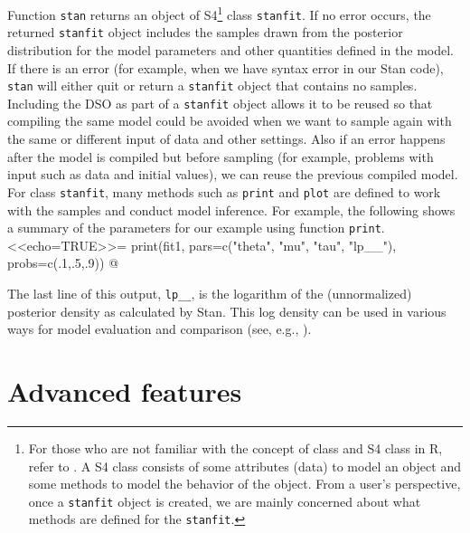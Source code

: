 \documentclass[12pt]{article}
\newcommand{\R}{R\xspace}
\newcommand{\Stan}{Stan\xspace}
\newcommand{\code}[1]{{\tt #1}}
\begin{document}
              Function \code{stan} returns an object of S4\footnote{For those who are not familiar 
                with the concept of class and S4 class in \R, refer to \cite{chambers2010software}. 
                A S4 class consists of some attributes (data) to model an object and 
                some methods to model the behavior of the object. From a user's perspective,  
                once a \code{stanfit} object is created, we are mainly concerned about what methods 
                are defined for the \code{stanfit}.} class \code{stanfit}.
                If no error occurs, the returned \code{stanfit} 
                object includes the samples drawn from the posterior distribution for the 
                model parameters and other quantities defined in the model. 
                If there is an error (for example, when we have syntax error in our \Stan code),
                \code{stan} will either quit or return a \code{stanfit} object that contains no
                samples. Including the DSO as part of a \code{stanfit} object
                allows it to be reused so that compiling the same model could be avoided when
                we want to sample again with the same or different input of data and other settings.
                Also if an error happens after the model is compiled but before sampling (for
                example, problems with input such as data and initial values),
                we can reuse the previous compiled model. 
                For class \code{stanfit}, many methods such as \code{print} and \code{plot} 
                are defined to work with the samples and conduct model inference. For example, 
                the following shows a summary of the parameters for our
                example using function \code{print}.
                <<echo=TRUE>>=
                print(fit1, pars=c("theta", "mu", "tau", "lp__"), 
                probs=c(.1,.5,.9))
                @
                
                The last line of this output, {\tt lp\_\_}, is the logarithm of the
                (unnormalized) posterior density as calculated by \Stan.  This log density can be used 
                in various ways for model evaluation and comparison (see, e.g., \citealt{Vehtari2012}).
                
                
                \section[Advanced features]{Advanced features}
                \label{sec0moredetails}
                
\end{document}
